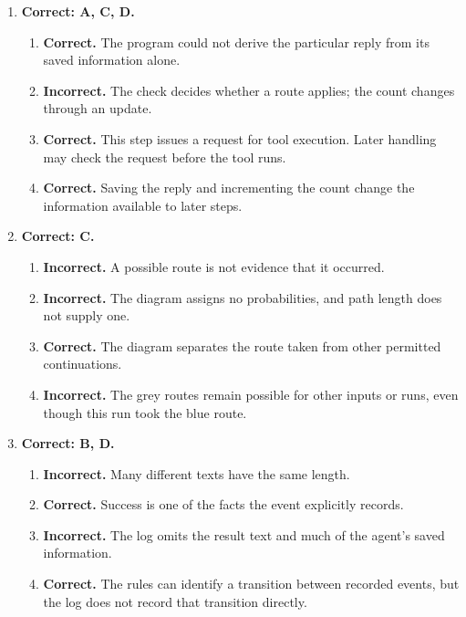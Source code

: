 \begin{enumerate}[start=1,itemsep=0.7\baselineskip]
\item[{\hyperref[exercise:6]{6.}}] \begin{minipage}[t]{\linewidth}
\textbf{Correct: A, C, D.}
\begin{enumerate}[label=\textnormal{(\Alph*)},leftmargin=*,itemsep=0pt]
\item \textbf{Correct.} The program could not derive the particular reply from its saved information alone.
\item \textbf{Incorrect.} The check decides whether a route applies; the count changes through an update.
\item \textbf{Correct.} This step issues a request for tool execution. Later handling may check the request before the tool runs.
\item \textbf{Correct.} Saving the reply and incrementing the count change the information available to later steps.
\end{enumerate}
\end{minipage}

\item[{\hyperref[exercise:7]{7.}}] \begin{minipage}[t]{\linewidth}
\textbf{Correct: C.}
\begin{enumerate}[label=\textnormal{(\Alph*)},leftmargin=*,itemsep=0pt]
\item \textbf{Incorrect.} A possible route is not evidence that it occurred.
\item \textbf{Incorrect.} The diagram assigns no probabilities, and path length does not supply one.
\item \textbf{Correct.} The diagram separates the route taken from other permitted continuations.
\item \textbf{Incorrect.} The grey routes remain possible for other inputs or runs, even though this run took the blue route.
\end{enumerate}
\end{minipage}

\item[{\hyperref[exercise:8]{8.}}] \begin{minipage}[t]{\linewidth}
\textbf{Correct: B, D.}
\begin{enumerate}[label=\textnormal{(\Alph*)},leftmargin=*,itemsep=0pt]
\item \textbf{Incorrect.} Many different texts have the same length.
\item \textbf{Correct.} Success is one of the facts the event explicitly records.
\item \textbf{Incorrect.} The log omits the result text and much of the agent's saved information.
\item \textbf{Correct.} The rules can identify a transition between recorded events, but the log does not record that transition directly.
\end{enumerate}
\end{minipage}


\end{enumerate}
